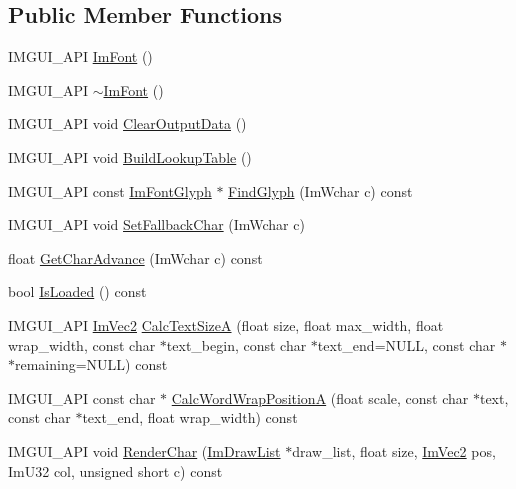 \subsection*{Public Member Functions}
\begin{DoxyCompactItemize}
\item 
I\+M\+G\+U\+I\+\_\+\+A\+PI \hyperlink{struct_im_font_a1d35b1eb7c2f6a3a648308531e88e7f1}{Im\+Font} ()
\item 
I\+M\+G\+U\+I\+\_\+\+A\+PI \hyperlink{struct_im_font_a377366ed7c5d076363ad4760aeff63ec}{$\sim$\+Im\+Font} ()
\item 
I\+M\+G\+U\+I\+\_\+\+A\+PI void \hyperlink{struct_im_font_aecf7773b1c40b433f91ee245f463de12}{Clear\+Output\+Data} ()
\item 
I\+M\+G\+U\+I\+\_\+\+A\+PI void \hyperlink{struct_im_font_a04b3a1437bd0032722bbbd3613941162}{Build\+Lookup\+Table} ()
\item 
I\+M\+G\+U\+I\+\_\+\+A\+PI const \hyperlink{struct_im_font_glyph}{Im\+Font\+Glyph} $\ast$ \hyperlink{struct_im_font_ac6a773b73c6406fd8f08c4c93213a501}{Find\+Glyph} (Im\+Wchar c) const
\item 
I\+M\+G\+U\+I\+\_\+\+A\+PI void \hyperlink{struct_im_font_a1f504f78cc066db20ea2d688e73a560b}{Set\+Fallback\+Char} (Im\+Wchar c)
\item 
float \hyperlink{struct_im_font_adffcff4e4e2d17455410bd4ba76b42e4}{Get\+Char\+Advance} (Im\+Wchar c) const
\item 
bool \hyperlink{struct_im_font_a97dafa61cc94e84be396d69b0d42b1ce}{Is\+Loaded} () const
\item 
I\+M\+G\+U\+I\+\_\+\+A\+PI \hyperlink{struct_im_vec2}{Im\+Vec2} \hyperlink{struct_im_font_ad67f64fd206ad197f4b93b1a1ae27cfe}{Calc\+Text\+SizeA} (float size, float max\+\_\+width, float wrap\+\_\+width, const char $\ast$text\+\_\+begin, const char $\ast$text\+\_\+end=N\+U\+LL, const char $\ast$$\ast$remaining=N\+U\+LL) const
\item 
I\+M\+G\+U\+I\+\_\+\+A\+PI const char $\ast$ \hyperlink{struct_im_font_a3781bb82a1ceba919cb6c98a398c7a67}{Calc\+Word\+Wrap\+PositionA} (float scale, const char $\ast$text, const char $\ast$text\+\_\+end, float wrap\+\_\+width) const
\item 
I\+M\+G\+U\+I\+\_\+\+A\+PI void \hyperlink{struct_im_font_af602fe8f445ae4142436ee3e6baa3ede}{Render\+Char} (\hyperlink{struct_im_draw_list}{Im\+Draw\+List} $\ast$draw\+\_\+list, float size, \hyperlink{struct_im_vec2}{Im\+Vec2} pos, Im\+U32 col, unsigned short c) const
\item 
$$
\end{DoxyCompactItemize}
